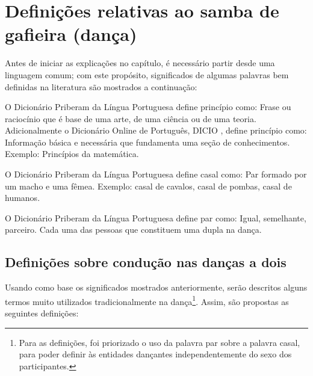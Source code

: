 
\section{Definições relativas ao samba de gafieira (dança)}

Antes de iniciar as explicações no capítulo, 
é necessário partir desde uma linguagem comum;
com este propósito, 
significados de algumas palavras bem definidas na literatura são mostrados a continuação:
 
\begin{definition}[Princípio] 
\label{def:Principio}O Dicionário Priberam da Língua Portuguesa \cite{priberamprincipio} define princípio como:
Frase ou raciocínio que é base de uma arte, de uma ciência ou de uma teoria.
Adicionalmente o Dicionário Online de Português, DICIO \cite{dicioprincipio}, define princípio como:
Informação básica e necessária que fundamenta uma seção de conhecimentos.
Exemplo: Princípios da matemática.
\end{definition}

\begin{definition}[Casal] 
\label{def:Casal} O Dicionário Priberam da Língua Portuguesa \cite{priberamcasal} define casal como:
Par formado por um macho e uma fêmea.
Exemplo: casal de cavalos, casal de pombas, casal de humanos.
\end{definition}

\begin{definition}[Par] 
\label{def:Par} O Dicionário Priberam da Língua Portuguesa \cite{priberampar} define par como:
Igual, semelhante, parceiro.
Cada uma das pessoas que constituem uma dupla na dança.
\end{definition}


\subsection{Definições sobre condução nas danças a dois}
Usando como base os significados mostrados anteriormente, 
serão descritos alguns termos muito utilizados tradicionalmente na dança\footnote{
Para as definições, foi priorizado o uso da palavra par sobre a palavra casal,
para poder definir às entidades dançantes independentemente do sexo dos participantes.}.
Assim,  são propostas as seguintes definições:

